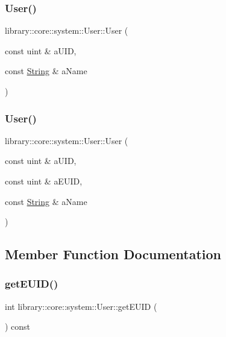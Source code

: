 \subsubsection{\texorpdfstring{User()}{User()}\hspace{0.1cm}{\footnotesize\ttfamily [1/2]}}
{\footnotesize\ttfamily library\+::core\+::system\+::\+User\+::\+User (\begin{DoxyParamCaption}\item[{const uint \&}]{a\+U\+ID,  }\item[{const \hyperlink{classlibrary_1_1core_1_1types_1_1_string}{String} \&}]{a\+Name }\end{DoxyParamCaption})}

\mbox{\label{classlibrary_1_1core_1_1system_1_1_user_a399449d4a49ca4ce9c060e17b0783fc8}} 
\subsubsection{\texorpdfstring{User()}{User()}\hspace{0.1cm}{\footnotesize\ttfamily [2/2]}}
{\footnotesize\ttfamily library\+::core\+::system\+::\+User\+::\+User (\begin{DoxyParamCaption}\item[{const uint \&}]{a\+U\+ID,  }\item[{const uint \&}]{a\+E\+U\+ID,  }\item[{const \hyperlink{classlibrary_1_1core_1_1types_1_1_string}{String} \&}]{a\+Name }\end{DoxyParamCaption})}



\subsection{Member Function Documentation}
\mbox{\label{classlibrary_1_1core_1_1system_1_1_user_a57d138f9dc1cd5994ef06f54974f16bc}} 
\subsubsection{\texorpdfstring{get\+E\+U\+I\+D()}{getEUID()}}
{\footnotesize\ttfamily int library\+::core\+::system\+::\+User\+::get\+E\+U\+ID (\begin{DoxyParamCaption}{ }\end{DoxyParamCaption}) const}

